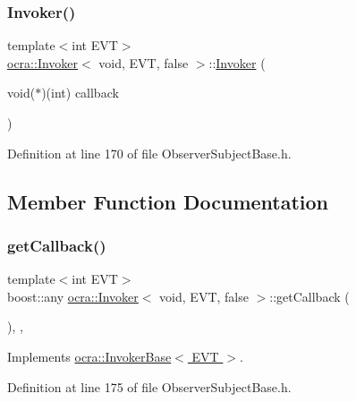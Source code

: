 \subsubsection{\texorpdfstring{Invoker()}{Invoker()}}
{\footnotesize\ttfamily template$<$int E\+VT$>$ \\
\hyperlink{classocra_1_1Invoker}{ocra\+::\+Invoker}$<$ void, E\+VT, false $>$\+::\hyperlink{classocra_1_1Invoker}{Invoker} (\begin{DoxyParamCaption}\item[{void($\ast$)(int)}]{callback }\end{DoxyParamCaption})\hspace{0.3cm}{\ttfamily [inline]}}



Definition at line 170 of file Observer\+Subject\+Base.\+h.



\subsection{Member Function Documentation}
\hypertarget{classocra_1_1Invoker_3_01void_00_01EVT_00_01false_01_4_a28f6e1841ccdb09d1bfefbb529d51f79}{}\label{classocra_1_1Invoker_3_01void_00_01EVT_00_01false_01_4_a28f6e1841ccdb09d1bfefbb529d51f79} 
\subsubsection{\texorpdfstring{get\+Callback()}{getCallback()}}
{\footnotesize\ttfamily template$<$int E\+VT$>$ \\
boost\+::any \hyperlink{classocra_1_1Invoker}{ocra\+::\+Invoker}$<$ void, E\+VT, false $>$\+::get\+Callback (\begin{DoxyParamCaption}{ }\end{DoxyParamCaption})\hspace{0.3cm}{\ttfamily [inline]}, {\ttfamily [protected]}, {\ttfamily [virtual]}}



Implements \hyperlink{classocra_1_1InvokerBase_aab9488dbb26120ccfa7c77be11c01ba9}{ocra\+::\+Invoker\+Base$<$ E\+V\+T $>$}.



Definition at line 175 of file Observer\+Subject\+Base.\+h.

